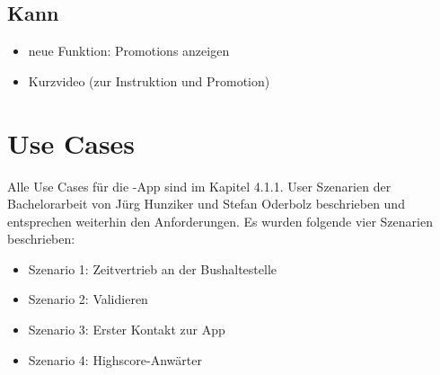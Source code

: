 \subsection{Kann}
\begin{itemize}
	\item neue Funktion: Promotions anzeigen
	\item Kurzvideo (zur Instruktion und Promotion)
\end{itemize}


\section{Use Cases}
Alle Use Cases für die \kort{}-App sind im Kapitel 4.1.1. User Szenarien der Bachelorarbeit von Jürg Hunziker und Stefan Oderbolz beschrieben und entsprechen weiterhin den Anforderungen. 
Es wurden folgende vier Szenarien beschrieben\cite{ba-kort-2012}: 

\begin{itemize}
	\item Szenario 1: Zeitvertrieb an der Bushaltestelle
	\item Szenario 2: Validieren
	\item Szenario 3: Erster Kontakt zur App
	\item Szenario 4: Highscore-Anwärter
\end{itemize}

